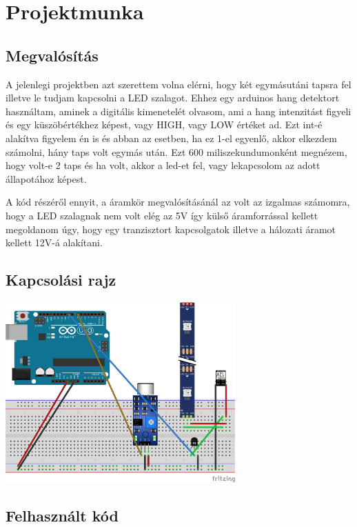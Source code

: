 \documentclass[a4paper,11pt]{article}
\begin{document}
\pagebreak

\section{Projektmunka}

\subsection{Megvalósítás}

A jelenlegi projektben azt szerettem volna elérni, hogy két egymásutáni tapsra fel illetve le tudjam kapcsolni a LED szalagot. Ehhez egy arduinos hang detektort használtam, aminek a digitális kimenetelét olvasom, ami a hang intenzitást figyeli és egy küszöbértékhez képest, vagy HIGH, vagy LOW értéket ad. Ezt int-é alakítva figyelem én is és abban az esetben, ha ez 1-el egyenlő, akkor elkezdem számolni, hány taps volt egymás után. Ezt 600 miliszekundumonként megnézem, hogy volt-e 2 taps és ha volt, akkor a led-et fel, vagy lekapcsolom az adott állapotához képest. 

A kód részéről ennyit, a áramkör megvalósításánál az volt az izgalmas számomra, hogy a LED szalagnak nem volt elég az 5V így külső áramforrással kellett megoldanom úgy, hogy egy tranzisztort kapcsolgatok illetve a hálozati áramot kellett 12V-á alakítani.

\subsection{Kapcsolási rajz}

\begin{center}
\includegraphics[width=0.66\textwidth]{Clapping_lamp_fritzing_bb.jpg}
\end{center}

\pagebreak

\subsection{Felhasznált kód}
\end{document}
